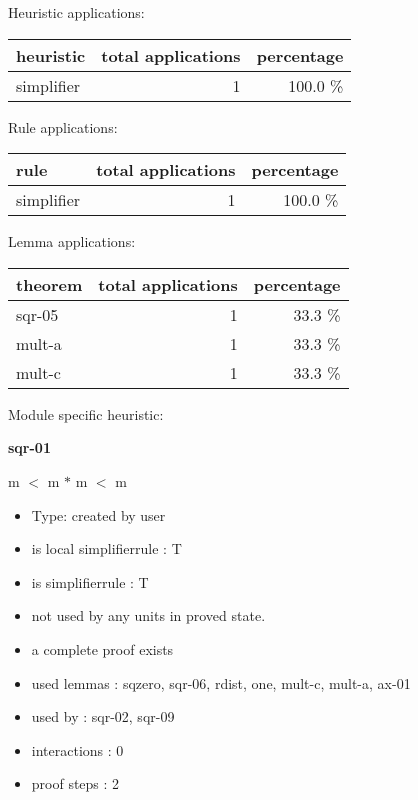 \documentclass[a4paper]{article}
\begin{document}
\medskip


Heuristic applications:

\begin{supertabular}{l|r|r}
heuristic	& total applications & percentage \\ \hline
simplifier & 1 & 100.0 \% \\

\end{supertabular}

Rule applications:

\begin{supertabular}{l|r|r}
rule	        & total applications & percentage \\ \hline
simplifier & 1 & 100.0 \% \\

\end{supertabular}

Lemma applications:

\begin{supertabular}{l|r|r}
theorem	        & total applications & percentage \\ \hline
sqr-05 & 1 & 33.3 \% \\
mult-a & 1 & 33.3 \% \\
mult-c & 1 & 33.3 \% \\

\end{supertabular}

Module specific heuristic:

\pagebreak

{\LARGE\bf sqr-01}\label{lemma-sqr-01}

\medskip

 \Fol m $<$ m $*$ m  $<$ m

\begin{itemize}

\item Type: created by user

\item is local simplifierrule : T
\item is simplifierrule : T
\item not used by any units in proved state.
\item       a complete proof exists
\item       used lemmas  : sqzero, sqr-06, rdist, one, mult-c, mult-a, ax-01
\item       used by      : sqr-02, sqr-09
\item       interactions : 0
\item       proof steps  : 2
\end{itemize}
\end{document}
